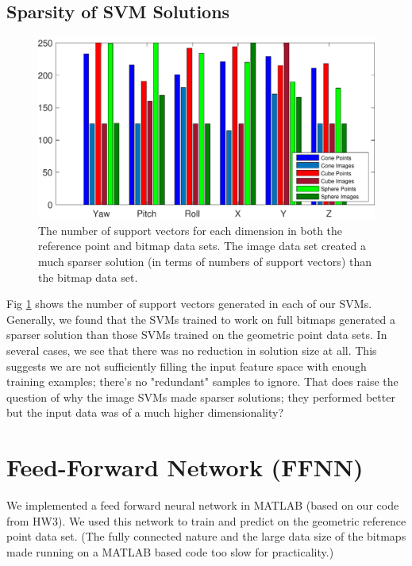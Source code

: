 \documentclass[journal]{IEEEtran}
\begin{document}
\subsection{Sparsity of SVM Solutions}
\begin{figure}[H]
	\hspace{-10 ex}

	\centering
	\includegraphics[width=0.9\linewidth]{supportVectors}

	\caption{The number of support vectors for each dimension in both the reference point and bitmap data sets. The image data set created a much sparser solution (in terms of numbers of support vectors) than the bitmap data set.}
	\label{supportVectors}
\end{figure}

Fig \ref{supportVectors} shows the number of support vectors generated in each of our SVMs. Generally, we found that the SVMs trained to work on full bitmaps generated a sparser solution than those SVMs trained on the geometric point data sets. In several cases, we see that there was no reduction in solution size at all. This suggests we are not sufficiently filling the input feature space with enough training examples; there's no "redundant" samples to ignore. That does raise the question of why the image SVMs made sparser solutions; they performed better but the input data was of a much higher dimensionality?


\section{Feed-Forward Network (FFNN)}
We implemented a feed forward neural network in MATLAB (based on our code from HW3). We used this network to train and predict on the geometric reference point data set. (The fully connected nature and the large data size of the bitmaps made running on a MATLAB based code too slow for practicality.)
\end{document}
